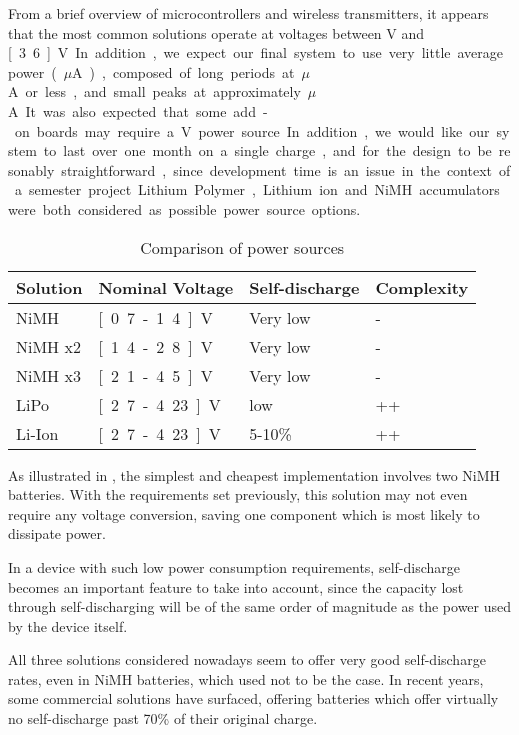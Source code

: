 From a brief overview of microcontrollers and wireless transmitters, it appears
that the most common solutions operate at voltages between \unit[2]{V} and
\unit[3.6]{V}. In addition, we expect our final system to use very little
average power (\unit[1-10]{$\mu$A}), composed of long periods at
\unit[1]{$\mu$A} or less, and small peaks at approximately \unit[50]{$\mu$A}. It
was also expected that some add-on boards may require a \unit[5]{V} power
source.

In addition, we would like our system to last over one month on a single charge, 
and for the design to be resonably straightforward, since development time is an
issue in the context of a semester project.

Lithium Polymer, Lithium ion and NiMH accumulators were both considered as
possible power source options. 

\begin{table}
  \centering
  \begin{tabular}{l|l|l|l}
    Solution	& Nominal Voltage	& Self-discharge	& Complexity \\
    \hline
    NiMH 	& \unit[0.7-1.4]{V}	& Very low		& -	     \\
    NiMH x2 	& \unit[1.4-2.8]{V}	& Very low		& -	     \\
    NiMH x3 	& \unit[2.1-4.5]{V}	& Very low		& -	     \\
    LiPo 	& \unit[2.7-4.23]{V}	& low			& ++	     \\
    Li-Ion 	& \unit[2.7-4.23]{V}	& 5-10\%		& ++	     \\
  \end{tabular}
  \caption{Comparison of power sources}
  \label{tab:battery-comparison}
\end{table}

As illustrated in , the simplest and cheapest
implementation involves two NiMH batteries. With the requirements set
previously, this solution may not even require any voltage conversion, saving
one component which is most likely to dissipate power.

In a device with such low power consumption requirements, self-discharge becomes
an important feature to take into account, since the capacity lost through
self-discharging will be of the same order of magnitude as the power used by the
device itself.

All three solutions considered nowadays seem to offer very good self-discharge
rates, even in NiMH batteries, which used not to be the case. In recent years,
some commercial solutions have surfaced, offering batteries which offer
virtually no self-discharge past 70\% of their original
charge\cite{testingeneloop}.

